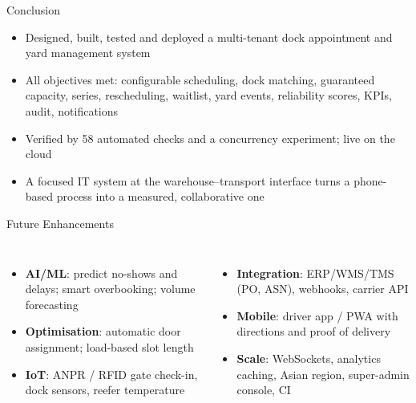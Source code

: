 \documentclass[aspectratio=169,11pt]{beamer}
\begin{document}
\begin{frame}{Conclusion}
\begin{itemize}
  \item Designed, built, tested and deployed a \alert{multi-tenant dock appointment and yard management system}
  \item All objectives met: configurable scheduling, dock matching, \alert{guaranteed capacity}, series, rescheduling, waitlist, yard events, reliability scores, KPIs, audit, notifications
  \item Verified by 58 automated checks and a concurrency experiment; live on the cloud
  \item A focused IT system at the warehouse--transport interface turns a phone-based process into a \alert{measured, collaborative} one
\end{itemize}
\end{frame}

\begin{frame}{Future Enhancements}
\begin{columns}[T]
\begin{itemize}\small
  \item \textbf{AI/ML}: predict no-shows and delays; smart overbooking; volume forecasting
  \item \textbf{Optimisation}: automatic door assignment; load-based slot length
  \item \textbf{IoT}: ANPR / RFID gate check-in, dock sensors, reefer temperature
\end{itemize}
\begin{itemize}\small
  \item \textbf{Integration}: ERP/WMS/TMS (PO, ASN), webhooks, carrier API
  \item \textbf{Mobile}: driver app / PWA with directions and proof of delivery
  \item \textbf{Scale}: WebSockets, analytics caching, Asian region, super-admin console, CI
\end{itemize}
\end{columns}
\end{frame}
\end{document}
